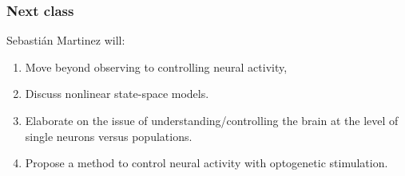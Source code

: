 \begin{frame}
    \frametitle{Next class}

    Sebastián Martinez will:

    \begin{enumerate}

        \item Move beyond observing to controlling neural activity,

        \item Discuss nonlinear state-space models.

        \item Elaborate on the issue of understanding/controlling the brain at
            the level of single neurons versus populations.

        \item Propose a method to control neural activity with optogenetic
            stimulation.

    \end{enumerate}
\end{frame}

